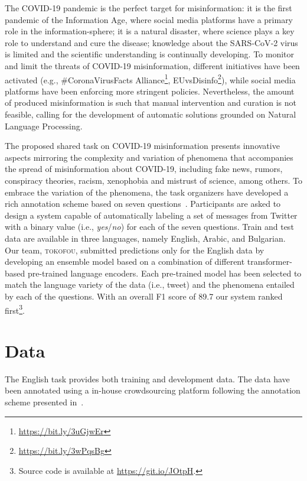 \documentclass[11pt,a4paper]{article}
\begin{document}
The COVID-19 pandemic is the perfect target for misinformation: it is the first pandemic of the Information Age, where social media platforms have a primary role in the information-sphere; it is a natural disaster, where science plays a key role to understand and cure the disease; knowledge about the SARS‑CoV‑2 virus is limited and the scientific understanding is continually developing. To monitor and limit the threats of COVID-19 misinformation, different initiatives have been activated (e.g., \#CoronaVirusFacts Alliance\footnote{\url{https://bit.ly/3uGjwEr}}, EUvsDisinfo\footnote{\url{https://bit.ly/3wPqsBg}}), while social media platforms have been enforcing more stringent policies. Nevertheless, the amount of produced misinformation is such that manual intervention and curation is not feasible, calling for the development of automatic solutions grounded on Natural Language Processing.

The proposed shared task on COVID-19 misinformation presents innovative aspects mirroring the complexity and variation of phenomena that accompanies the spread of misinformation about COVID-19, including fake news, rumors, conspiracy theories, racism, xenophobia and mistrust of science, among others. To embrace the variation of the phenomena, the task organizers have developed a rich annotation scheme based on seven questions~\cite{NLP4IF-2021-COVID19-task}. Participants are asked to design a system capable of automatically labeling a set of messages from Twitter with a binary value (i.e., \textit{yes}/\textit{no}) for each of the seven questions. Train and test data are available in three languages, namely English, Arabic, and Bulgarian. Our team, \textsc{tokofou}, submitted predictions only for the English data by developing an ensemble model based on a combination of different transformer-based pre-trained language encoders. Each pre-trained model has been selected to match the language variety of the data (i.e., tweet) and the phenomena entailed by each of the questions. With an overall F1 score of 89.7 our system ranked first\footnote{Source code is available at \href{https://github.com/gtziafas/nlp4ifchallenge}{https://git.io/JOtpH}.}.


\section{Data}

The English task provides both training and development data. The data have been annotated using a in-house crowdsourcing platform following the annotation scheme presented in~\citet{alam2020fighting}. 
\end{document}
